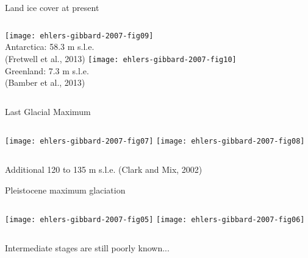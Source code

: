     \begin{frame}{Land ice cover at present}
      \begin{columns}
        \column{60mm}
          \texttt{[image: ehlers-gibbard-2007-fig09]}\\
          \bigskip
          Antarctica: 58.3 m s.l.e.\\
          (Fretwell et al., 2013)
        \column{60mm}
          \texttt{[image: ehlers-gibbard-2007-fig10]}\\
          \bigskip
          Greenland: 7.3 m s.l.e.\\
          (Bamber et al., 2013)
      \end{columns}
    \end{frame}

    \begin{frame}{Last Glacial Maximum}
      \begin{columns}
        \column{60mm}
          \texttt{[image: ehlers-gibbard-2007-fig07]}
        \column{60mm}
          \texttt{[image: ehlers-gibbard-2007-fig08]}
      \end{columns}
      \bigskip
      Additional 120 to 135 m s.l.e. (Clark and Mix, 2002)
    \end{frame}

    \begin{frame}{Pleistocene maximum glaciation}
      \begin{columns}
        \column{60mm}
          \texttt{[image: ehlers-gibbard-2007-fig05]}
        \column{60mm}
          \texttt{[image: ehlers-gibbard-2007-fig06]}
      \end{columns}
      \bigskip
      Intermediate stages are still poorly known...
    \end{frame}

